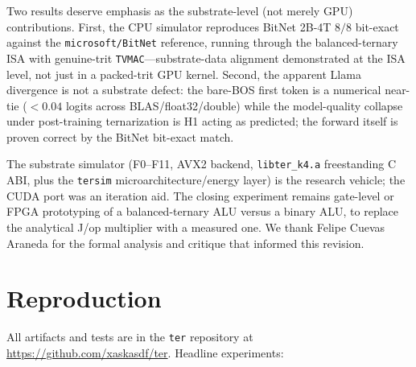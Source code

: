 \documentclass{article}
\begin{document}
Two results deserve emphasis as the substrate-level (not merely {GPU})
contributions. First, the {CPU} simulator reproduces BitNet 2B-4T
$8/8$ bit-exact against the \texttt{microsoft/BitNet} reference,
running through the balanced-ternary {ISA} with genuine-trit
\texttt{TVMAC}---substrate-data alignment demonstrated at the {ISA}
level, not just in a packed-trit {GPU} kernel. Second, the apparent
Llama divergence is not a substrate defect: the bare-{BOS} first token
is a numerical near-tie ($<0.04$ logits across {BLAS}/float32/double)
while the model-quality collapse under post-training ternarization is
H1 acting as predicted; the forward itself is proven correct by the
BitNet bit-exact match.

The substrate simulator (F0--F11, AVX2 backend,
\texttt{libter\_k4.a} freestanding {C} {ABI}, plus the \texttt{tersim}
microarchitecture/energy layer) is the research vehicle; the {CUDA}
port was an iteration aid. The closing experiment remains gate-level or
{FPGA} prototyping of a balanced-ternary {ALU} versus a binary {ALU},
to replace the analytical J/op multiplier with a measured one. We thank
Felipe Cuevas Araneda \citep{cuevas-formal-2026} for the formal
analysis and critique that informed this revision.

\section*{Reproduction}

All artifacts and tests are in the \texttt{ter} repository at
\url{https://github.com/xaskasdf/ter}. Headline experiments:
\end{document}
